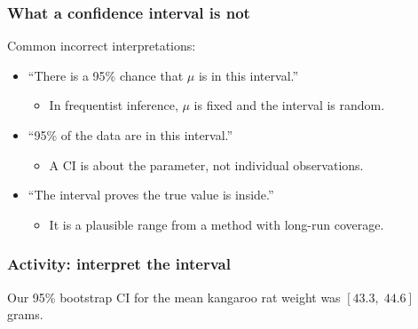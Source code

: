 \documentclass[slidestop,compress,mathserif]{beamer}
\begin{document}
\begin{frame}
\frametitle{What a confidence interval is not}

Common incorrect interpretations:

\begin{itemize}
\item ``There is a 95\% chance that $\mu$ is in this interval.''
  \begin{itemize}
  \item In frequentist inference, $\mu$ is fixed and the interval is random.
  \end{itemize}
\item ``95\% of the data are in this interval.''
  \begin{itemize}
  \item A CI is about the parameter, not individual observations.
  \end{itemize}
\item ``The interval proves the true value is inside.''
  \begin{itemize}
  \item It is a plausible range from a method with long-run coverage.
  \end{itemize}
\end{itemize}

\end{frame}


\begin{frame}
\frametitle{Activity: interpret the interval}

Our 95\% bootstrap CI for the mean kangaroo rat weight was $[43.3,\;44.6]$ grams.


\end{frame}
\end{document}
